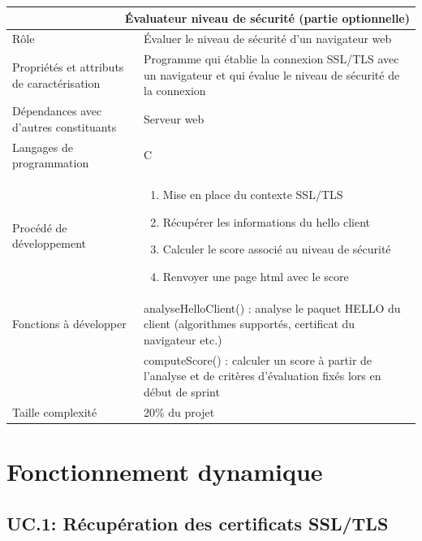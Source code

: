 \documentclass[a4paper,11pt,french]{article}
\begin{document}
\begin{center}
	\vspace*{0.7cm}
	\begin{tabularx}{16cm}{|l|X|}
	\hline
	\multicolumn{2}{|r|}{\textbf{Évaluateur niveau de sécurité (partie optionnelle)}}\\
	\hline
	R\^ole & Évaluer le niveau de sécurité d'un navigateur web \\
	\hline
	Propriétés et attributs de caractérisation & Programme qui établie la connexion SSL/TLS avec un navigateur et qui évalue le niveau de sécurité de la connexion\\
	\hline
	Dépendances avec d'autres constituants & Serveur web \\
	\hline
	Langages de programmation & C\\
	\hline
	Procédé de développement & \begin{enumerate} \item Mise en place du contexte SSL/TLS \item Récupérer les informations du hello client \item Calculer le score associé au niveau de sécurité \item Renvoyer une page html avec le score \end{enumerate}\\
	\hline
	Fonctions à développer & analyseHelloClient() : analyse le paquet HELLO du client (algorithmes supportés, certificat du navigateur etc.)\\
	& computeScore() : calculer un score à partir de l'analyse et de critères d'évaluation fixés lors en début de sprint\\
	\hline
	Taille complexité & 20\% du projet\\
	\hline
	\end{tabularx}
\end{center}

\newpage
\section{Fonctionnement dynamique}

\subsection{UC.1: Récupération des certificats SSL/TLS}
\end{document}

